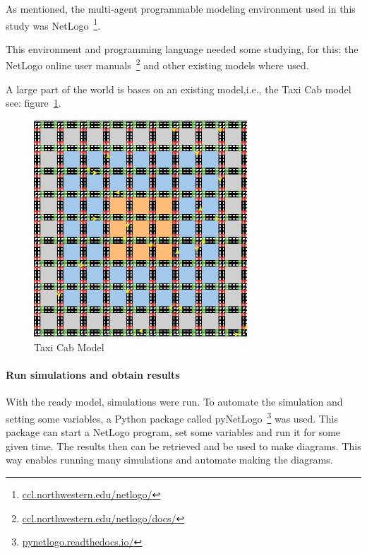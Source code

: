As mentioned, the multi-agent programmable modeling environment used in this study was NetLogo~\footnote{\url{ccl.northwestern.edu/netlogo/}}.

This environment and programming language needed some studying, for this: the NetLogo online user manuals~\footnote{\url{ccl.northwestern.edu/netlogo/docs/}} and other existing models where used.

A large part of the world is bases on an existing model,i.e., the Taxi Cab model~\cite{dongpingtaxicabs2019} see: figure~\ref{fig:taxicabmodel}.

\begin{figure}
    \centering
    \includegraphics[width=8cm]{sections/pics/Taxi Cabs}
    \caption{Taxi Cab Model}
    \label{fig:taxicabmodel}
\end{figure}

\paragraph{Run simulations and obtain results}
With the ready model, simulations were run.
To automate the simulation and setting some variables, a Python package called pyNetLogo~\footnote{\url{pynetlogo.readthedocs.io/}} was used.
This package can start a NetLogo program, set some variables and run it for some given time.
The results then can be retrieved and be used to make diagrams.
This way enables running many simulations and automate making the diagrams.










